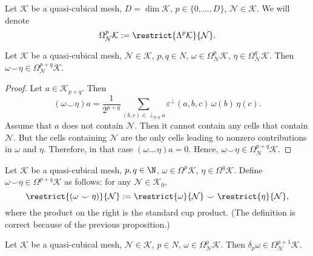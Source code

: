 \begin{notation}
  Let
    $\mathcal{K}$ be a quasi-cubical mesh,
    $D = \dim \mathcal{K}$,
    $p \in \{0, ..., D\}$,
    $\mathcal{N} \in \mathcal{K}$.
  We will denote
  \begin{equation}
    \Omega^p_\mathcal{N} \mathcal{K}
    := \restrict{\Lambda^p \mathcal{K}}{\mathcal{N}}.
  \end{equation}
\end{notation}
\begin{proposition}
  Let
    $\mathcal{K}$ be a quasi-cubical mesh,
    $\mathcal{N} \in \mathcal{K}$,
    $p, q \in N$,
    $\omega \in \Omega^p_\mathcal{N} \mathcal{K}$,
    $\eta \in \Omega^q_\mathcal{N} \mathcal{K}$.
  Then
  $\omega \smile \eta \in \Omega^{p + q}_\mathcal{N} \mathcal{K}$.
\end{proposition}
\begin{proof}
  Let $a \in \mathcal{K}_{p + q}$.
  Then
  \begin{equation}
    (\omega \smile \eta) a
    = \frac{1}{2^{p + q}}
      \sum_{(b, c) \in \perp_{p, q} a}
        \varepsilon^\perp(a, b, c)\, \omega(b)\, \eta(c).
  \end{equation}
  Assume that $a$ does not contain $\mathcal{N}$.
  Then it cannot contain any cells that contain $\mathcal{N}$.
  But the cells containing $\mathcal{N}$ are the only cells leading to nonzero
  contributions in $\omega$ and $\eta$.
  Therefore, in that case $(\omega \smile \eta) a = 0$.
  Hence,
  $\omega \smile \eta \in \Omega^{p + q}_\mathcal{N} \mathcal{K}$.
\end{proof}
\begin{definition}
  Let
    $\mathcal{K}$ be a quasi-cubical mesh,
    $p, q \in \N$,
    $\omega \in \Omega^p \mathcal{K}$,
    $\eta \in \Omega^q \mathcal{K}$.
  Define $\omega \smile \eta \in \Omega^{p + q} \mathcal{K}$ as follows:
  for any $\mathcal{N} \in \mathcal{K}_0$,
  \begin{equation}
    \restrict{(\omega \smile \eta)}{\mathcal{N}}
    := \restrict{\omega}{\mathcal{N}} \smile \restrict{\eta}{\mathcal{N}},
  \end{equation}
  where the product on the right is the standard cup product.
  (The definition is correct because of the previous proposition.)
\end{definition}
\begin{proposition}
  Let
    $\mathcal{K}$ be a quasi-cubical mesh,
    $\mathcal{N} \in \mathcal{K}$,
    $p \in N$,
    $\omega \in \Omega^p_\mathcal{N} \mathcal{K}$.
  Then $\delta_p \omega \in \Omega^{p + 1}_\mathcal{N} \mathcal{K}$.
\end{proposition}
